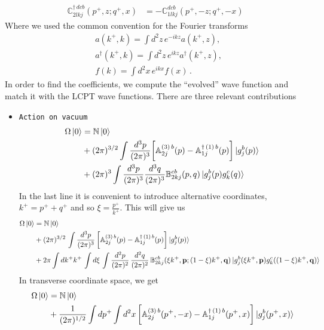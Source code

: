 \documentclass[aps,prd,amsmath,amssymb,nofootinbib]{revtex4-2}
\def\mf#1{\mathbb{#1}}
\def\v#1{\mathbf{#1}}
\numberwithin{equation}{section}
\begin{document}
\begin{align}
     \mf{C}^{\dagger\, dcb}_{2lkj}(p^{+},z; q^{+},x) & =  -\mf{C}^{dcb}_{1lkj}(p^{+}, -z; q^{+}, -x)
\end{align}
Where we used the common  convention for the Fourier transforms 
\begin{align}
    &a(k^+, k) = \int d^2z\, e^{-i k z} a(k^+,z), \\ 
    &a^\dagger(k^+, k) = \int d^2z\, e^{i k z} a^\dagger(k^+, z), \\ 
    & f (k) = \int d^2x\, e^{ikx} f(x)\,.
\end{align}
In order to find the coefficients, we compute the ``evolved'' wave function and match it with the LCPT wave functions. There are three relevant contributions 
\begin{itemize}
\item{\texttt{Action on vacuum}} 
\begin{align} \label{Omegaonvacmom1}
    \Omega\ket{0} & = \mf{N}\ket{0} \notag \\ &
    +(2\pi)^{3/2}\int \frac{d^3p}{(2\pi)^3}\bigg[\mf{A}^{(3)\, b}_{2j}(p)
    -\mf{A}^{\dagger\, (1)\, b}_{1j}(p)\bigg]\ket{g^{b}_{j}(p)} \notag \\ & 
    +(2\pi)^{3}\int \frac{d^3p}{(2\pi)^3} \frac{d^3q}{(2\pi)^3}  \mf{B}^{cb}_{2kj}(p,q)\ket{g^{b}_{j}(p)g^{c}_{k}(q)}
\end{align} 
In the last line it is convenient to introduce alternative coordinates, $k^+  = p^+ + q^+$ and so  $\xi = \frac{p^+}{k^+}$. This will give us 
\begin{align} \label{Omegaonvacmomzeta}
    \Omega\ket{0} & = \mf{N}\ket{0} \notag \\ &
    + (2\pi)^{3/2}\,\int \frac{d^3p}{(2\pi)^3}\,
    \bigg[\mf{A}^{(3)\, b}_{2j}(p)
    -\mf{A}^{\dagger\,(1)\, b}_{1j}(p)\bigg]\ket{g^{b}_{j}(p)} \notag \\ &
    + 2\pi \int dk^+ k^+ \,\int d \xi\,  \int \frac{d^2p}{(2\pi)^2}\, \frac{d^2q}{(2\pi)^2}\,  \mf{B}^{cb}_{2kj}(\xi k^+, \v p;  (1-\xi) k^+, \v q) \ket{g^{b}_{j}(\xi k^+, \v p)g^{c}_{k}((1-\xi) k^+, \v q)}
\end{align} 
In transverse coordinate space, we get 
\begin{align} \label{Omegaonvacpos}
    \Omega\ket{0} & = \mf{N}\ket{0} \notag \\ &
    + \frac{1}{(2\pi)^{1/2}}\int dp^{+} \int d^{2}x\,
   \bigg[\mf{A}^{(3)\, b}_{2j}(p^{+}, - x)
   -\mf{A}^{\dagger\,(1)\, b}_{1j}(p^{+},x)\bigg]\ket{g^{b}_{j}(p^{+},x)} \notag \\ & 

\end{align}
\end{itemize}
\end{document}
